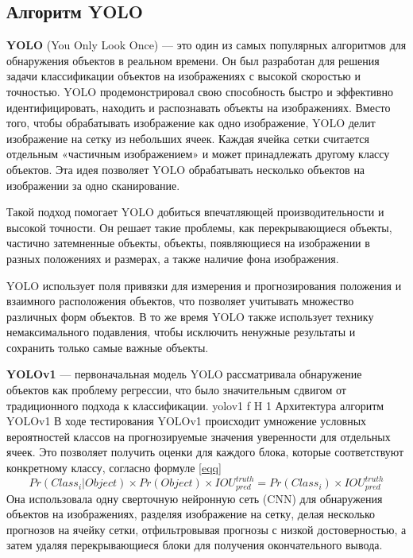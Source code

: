 \subsection{Алгоритм YOLO}
\textbf{YOLO} (You Only Look Once) — это один из самых популярных алгоритмов для обнаружения объектов в реальном времени. 
Он был разработан для решения задачи классификации объектов на изображениях с высокой скоростью и точностью. 
YOLO продемонстрировал свою способность быстро и эффективно идентифицировать, находить и распознавать объекты на изображениях. Вместо того, чтобы обрабатывать изображение как одно изображение, YOLO делит изображение на сетку из небольших ячеек. Каждая ячейка сетки считается отдельным «частичным изображением» и может принадлежать другому классу объектов. Эта идея позволяет YOLO обрабатывать несколько объектов на изображении за одно сканирование.

Такой подход помогает YOLO добиться впечатляющей производительности и высокой точности. Он решает такие проблемы, как перекрывающиеся объекты, частично затемненные объекты, объекты, появляющиеся на изображении в разных положениях и размерах, а также наличие фона изображения.

YOLO использует поля привязки для измерения и прогнозирования положения и взаимного расположения объектов, что позволяет учитывать множество различных форм объектов. В то же время YOLO также использует технику немаксимального подавления, чтобы исключить ненужные результаты и сохранить только самые важные объекты.

\textbf{YOLOv1} --- первоначальная модель YOLO рассматривала обнаружение объектов как проблему регрессии, что было значительным сдвигом от традиционного подхода к классификации.
	{yolov1}
	{f}
	{H}
	{1\textwidth}
	{Архитектура алгоритм YOLOv1}
В ходе тестирования YOLOv1 происходит умножение условных вероятностей классов на прогнозируемые значения уверенности для отдельных ячеек. Это позволяет получить оценки для каждого блока, которые соответствуют конкретному классу, согласно формуле \ref{eqq}
\begin{equation}
	\label{eqq}
	Pr(Class_{i} | Object) \times Pr(Object) \times IOU^{truth}_{pred} = Pr(Class_{i}) \times IOU^{truth}_{pred}
\end{equation}
Она использовала одну сверточную нейронную сеть (CNN) для обнаружения объектов на изображениях, разделяя изображение на сетку, делая несколько прогнозов на ячейку сетки, отфильтровывая прогнозы с низкой достоверностью, а затем удаляя перекрывающиеся блоки для получения окончательного вывода.

